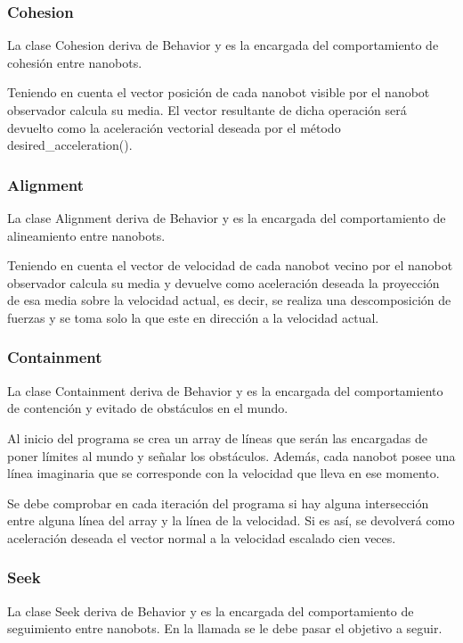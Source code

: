 \subsubsection{Cohesion}
\label{sec:cohesion}
La clase Cohesion deriva de Behavior y es la encargada del comportamiento de cohesión entre nanobots.

Teniendo en cuenta el vector posición de cada nanobot visible por el nanobot observador calcula su media. El vector resultante de dicha operación será devuelto como la aceleración vectorial deseada por el método desired\_acceleration().

\subsubsection{Alignment}
\label{sec:alignment}
La clase Alignment deriva de Behavior y es la encargada del comportamiento de alineamiento entre nanobots.

Teniendo en cuenta el vector de velocidad de cada nanobot vecino por el nanobot observador calcula su media y devuelve como aceleración deseada la proyección de esa media sobre la velocidad actual, es decir, se realiza una descomposición de fuerzas y se toma solo la que este en dirección a la velocidad actual.

\subsubsection{Containment}
\label{sec:containment}
La clase Containment deriva de Behavior y es la encargada del comportamiento de contención y evitado de obstáculos en el mundo.

Al inicio del programa se crea un array de líneas que serán las encargadas de poner límites al mundo y señalar los obstáculos. Además, cada nanobot posee una línea imaginaria que se corresponde con la velocidad que lleva en ese momento.

Se debe comprobar en cada iteración del programa si hay alguna intersección entre alguna línea del array y la línea de la velocidad. Si es así, se devolverá como aceleración deseada el vector normal a la velocidad escalado cien veces.

\subsubsection{Seek}
\label{sec:seek}
La clase Seek deriva de Behavior y es la encargada del comportamiento de seguimiento entre nanobots. En la llamada se le debe pasar el objetivo a seguir. 

